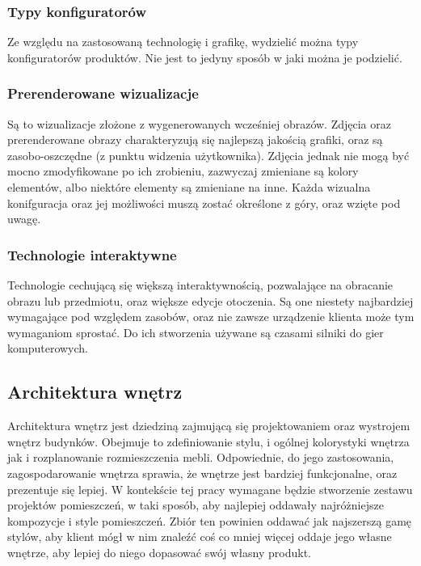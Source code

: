 \documentclass{article} %
\begin{document}
        \subsubsection{Typy konfiguratorów}
        Ze względu na zastosowaną technologię i grafikę, wydzielić można typy konfiguratorów produktów. Nie jest to jedyny sposób w jaki można je podzielić.
        \\
        
        \subsubsection*{Prerenderowane wizualizacje}
        Są to wizualizacje złożone z wygenerowanych wcześniej obrazów. Zdjęcia oraz prerenderowane obrazy charakteryzują się najlepszą jakością grafiki, oraz są zasobo-oszczędne (z punktu widzenia użytkownika). Zdjęcia jednak nie mogą być mocno zmodyfikowane po ich zrobieniu, zazwyczaj zmieniane są kolory elementów, albo niektóre elementy są zmieniane na inne. Każda wizualna konifguracja oraz jej możliwości muszą zostać określone z góry, oraz wzięte pod uwagę. 
        \\
        
        \subsubsection*{Technologie interaktywne}
        Technologie cechującą się większą interaktywnością, pozwalające na obracanie obrazu lub przedmiotu, oraz większe edycje otoczenia. Są one niestety najbardziej wymagające pod względem zasobów, oraz nie zawsze urządzenie klienta może tym wymaganiom sprostać. Do ich stworzenia używane są czasami silniki do gier komputerowych.
        \\
    
    \subsection{Architektura wnętrz}
        Architektura wnętrz jest dziedziną zajmującą się projektowaniem oraz wystrojem wnętrz budynków. Obejmuje to zdefiniowanie stylu, i ogólnej kolorystyki wnętrza jak i rozplanowanie rozmieszczenia mebli. Odpowiednie, do jego zastosowania, zagospodarowanie wnętrza sprawia, że wnętrze jest bardziej funkcjonalne, oraz prezentuje się lepiej. \cite{architecture} W kontekście tej pracy wymagane będzie stworzenie zestawu projektów pomieszczeń, w taki sposób, aby najlepiej oddawały najróżniejsze kompozycje i style pomieszczeń. Zbiór ten powinien oddawać jak najszerszą gamę stylów, aby klient mógł w nim znaleźć coś co mniej więcej oddaje jego własne wnętrze, aby lepiej do niego dopasować swój własny produkt.
        \\
        
\end{document}

